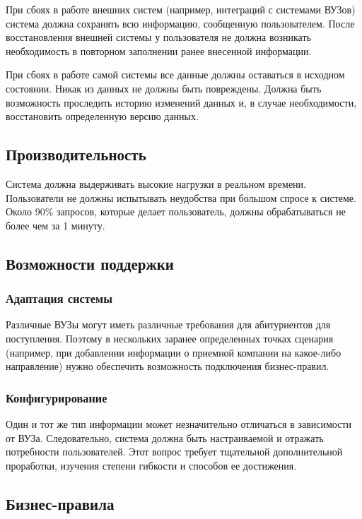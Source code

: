 \documentclass[a4paper, 14pt]{extarticle}
\begin{document}
При сбоях в работе внешних систем (например, интеграций с системами ВУЗов)
система должна сохранять всю информацию, сообщенную пользователем. После
восстановления внешней системы у пользователя не должна возникать необходимость
в повторном заполнении ранее внесенной информации.

При сбоях в работе самой системы все данные должны оставаться в исходном
состоянии. Никак из данных не должны быть повреждены. Должна быть возможность
проследить историю изменений данных и, в случае необходимости, восстановить
определенную версию данных.

\subsection*{Производительность}

Система должна выдерживать высокие нагрузки в реальном времени. Пользователи не
должны испытывать неудобства при большом спросе к системе. Около 90\% запросов,
которые делает пользователь, должны обрабатываться не более чем за 1 минуту.

\subsection*{Возможности поддержки}

\subsubsection*{Адаптация системы}

Различные ВУЗы могут иметь различные требования для абитуриентов для
поступления. Поэтому в нескольких заранее определенных точках сценария
(например, при добавлении информации о приемной компании на какое-либо
направление) нужно обеспечить возможность подключения бизнес-правил.

\subsubsection*{Конфигурирование}

Один и тот же тип информации может незначительно отличаться в зависимости от
ВУЗа. Следовательно, система должна быть настраиваемой и отражать потребности
пользователей. Этот вопрос требует тщательной дополнительной проработки,
изучения степени гибкости и способов ее достижения.

\subsection*{Бизнес-правила}
\end{document}

